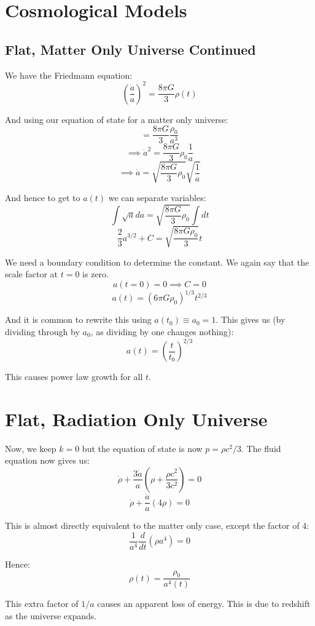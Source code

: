 
\section{Cosmological Models}

\subsection{Flat, Matter Only Universe Continued}
We have the Friedmann equation:
\[
    \left(\frac{\dot{a}}{a}\right)^2 = \frac{8 \pi G}{3} \rho(t)
\]

And using our equation of state for a matter only universe:
\[
    = \frac{8 \pi G}{3} \frac{\rho_0}{a^3}
\]
\[
    \implies \dot{a}^2 = \frac{8 \pi G}{3} \rho_0 \frac{1}{a}
\]
\[
    \implies \dot{a} = \sqrt{\frac{8 \pi G}{3} \rho_0} \sqrt{\frac{1}{a}}
\]

And hence to get to $a(t)$ we can separate variables:
\[
    \int \sqrt{a} da = \sqrt{\frac{8 \pi G}{3} \rho_0} \int dt
\]
\[
    \frac{2}{3}a^{3/2} + C = \sqrt{\frac{8 \pi G \rho_0}{3}} t
\]

We need a boundary condition to determine the constant. We again say that the scale factor at $t=0$ is zero.
\[
    a(t = 0) = 0 \implies C = 0
\]
\[
    a(t) = (6 \pi G \rho_0)^{1/3} t^{2/3}
\]

And it is common to rewrite this using $a(t_0) \equiv a_0 = 1$. This gives us (by dividing through by $a_0$, as dividing by one changes nothing):
\[
    a(t) = \left(\frac{t}{t_0}\right)^{2/3}
\]

This causes power law growth for all $t$.

\section{Flat, Radiation Only Universe}
Now, we keep $k=0$ but the equation of state is now $p = \rho c^2/3$. The fluid equation now gives us:
\[
    \dot{\rho} + \frac{3 \dot{a}}{a} \left(\rho + \frac{\rho c^2}{3 c^2}\right) = 0
\]
\[
    \dot{\rho} + \frac{\dot{a}}{a} \left(4 \rho\right) = 0
\]

This is almost directly equivalent to the matter only case, except the factor of 4:
\[
    \frac{1}{a^4} \frac{d}{dt} \left(\rho a^4\right) = 0
\]

Hence:
\[
    \rho(t) = \frac{\rho_0}{a^4(t)}
\]

This extra factor of $1/a$ causes an apparent loss of energy. This is due to redshift as the universe expands. 

